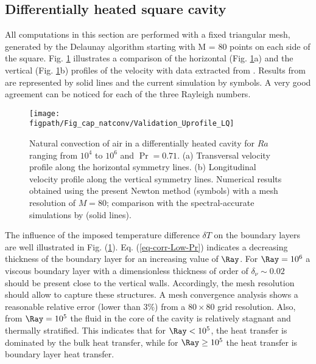 \subsection{Differentially heated square cavity} \label{sub-diff-heated}
All computations in this section are performed with a fixed triangular mesh, generated by the Delaunay algorithm starting with M = 80 points on each side of the square.
Fig. \ref{fig-T1-prof} illustrates a comparison of the horizontal (Fig. \ref{fig-T1-prof}a) and the vertical (Fig. \ref{fig-T1-prof}b)  profiles of the velocity with data extracted from  \cite{LeQuere91}.
Results from \cite{LeQuere91} are represented by solid lines and the current simulation by symbols.
A very good agreement can  be noticed for each of the three Rayleigh numbers.

\begin{figure}
	\begin{center}
		\texttt{[image: \\figpath/Fig\_cap\_natconv/Validation\_Uprofile\_LQ]} 
	\end{center}
	\caption{Natural convection of air in a differentially heated cavity for $Ra$ ranging from $10^4$ to $10^6$ and $\Pr = 0.71$. (a) Transversal velocity profile along the  horizontal symmetry lines. (b) Longitudinal velocity profile along the vertical symmetry lines. Numerical results obtained using the present Newton method (symbols) with a mesh resolution of $M=80$; comparison with the spectral-accurate simulations by \cite{LeQuere91} (solid lines).}
	\label{fig-T1-prof}
\end{figure}

The influence of the imposed temperature difference $\delta T$ on the boundary layers are well illustrated in Fig.  (\ref{fig-T1-prof}).
Eq. (\ref{eq-corr-Low-Pr}) indicates a decreasing thickness of the boundary layer for an increasing value of $\Ray$. 
For $\Ray = 10^6$ a viscous boundary layer with a dimensionless thickness of order of $\delta_\nu \sim 0.02$ should be present close to the vertical walls.
Accordingly, the mesh resolution should allow to capture these structures.
A mesh convergence analysis shows a reasonable relative error (lower than $3\%$) from a $80 \times 80$ grid resolution.
Also, from $\Ray = 10^5$ the fluid in the core of the cavity is relatively stagnant and thermally stratified.
This indicates that for $\Ray < 10^5$, the heat transfer is dominated by the bulk heat transfer, while for $\Ray \geq 10^5$ the heat transfer is boundary layer heat transfer.

